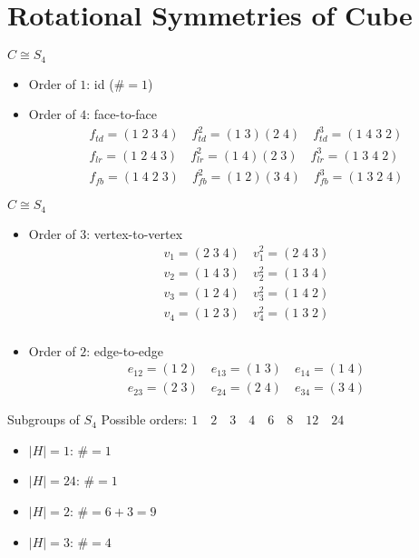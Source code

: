 \section{Rotational Symmetries of Cube}

\begin{frame}{$C \cong S_4$}
  \begin{itemize}
    \item Order of $1$: id ($\# = 1$)
    \item Order of $4$: face-to-face
      \begin{align*}
	 f_{td} = (1\;2\;3\;4) \quad f_{td}^{2} = (1\;3) (2\;4)  \quad f_{td}^{3} = (1\;4\;3\;2) \\
	 f_{lr} = (1\;2\;4\;3) \quad f_{lr}^{2} = (1\;4) (2\;3)  \quad f_{lr}^{3} = (1\;3\;4\;2) \\
	 f_{fb} = (1\;4\;2\;3) \quad f_{fb}^{2} = (1\;2) (3\;4)  \quad f_{fb}^{3} = (1\;3\;2\;4)
      \end{align*}
  \end{itemize}
\end{frame}
\begin{frame}{$C \cong S_4$}
  \begin{itemize}
    \item Order of $3$: vertex-to-vertex
      \begin{align*}
        v_{1} = (2\;3\;4) \quad v_{1}^{2} = (2\;4\;3) \\
        v_{2} = (1\;4\;3) \quad v_{2}^{2} = (1\;3\;4) \\
        v_{3} = (1\;2\;4) \quad v_{3}^{2} = (1\;4\;2) \\
        v_{4} = (1\;2\;3) \quad v_{4}^{2} = (1\;3\;2) \\
      \end{align*}
    \item Order of $2$: edge-to-edge
      \begin{align*}
        e_{12} = (1\;2) \quad e_{13} = (1\;3) \quad e_{14} = (1\;4) \\
        e_{23} = (2\;3) \quad e_{24} = (2\;4) \quad e_{34} = (3\;4)
      \end{align*}
  \end{itemize}
\end{frame}
\begin{frame}{Subgroups of $S_4$}
  Possible orders: $1 \quad 2 \quad 3 \quad 4 \quad 6 \quad 8 \quad 12 \quad 24$

  \begin{itemize}
    \item $|H| = 1$: $\# = 1$
    \item $|H| = 24$: $\# = 1$
    \item $|H| = 2$: $\# = 6 + 3 = 9$
    \item $|H| = 3$: $\# = 4$
  \end{itemize}
\end{frame}

